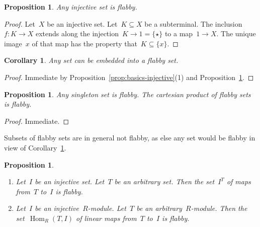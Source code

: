 \documentclass[oneside]{amsart}
\theoremstyle{definition}
\theoremstyle{plain}
\newtheorem{prop}[defn]{Proposition}
\newtheorem{cor}[defn]{Corollary}
\theoremstyle{remark}
\DeclareMathOperator{\Hom}{Hom}
\renewcommand{\_}{\mathpunct{.}\,}
\begin{document}
\begin{prop}\label{prop:injective-flabby}
Any injective set is flabby.\end{prop}

\begin{proof}Let~$X$ be an injective set. Let~$K \subseteq X$ be a subterminal.
The inclusion~$f : K \to X$ extends along the injection~$K \to 1 = \{\star\}$
to a map~$1 \to X$. The unique image~$x$ of that map has the property that~$K
\subseteq \{x\}$.\end{proof}

\begin{cor}\label{cor:enough-flabby-sets}
Any set can be embedded into a flabby set.\end{cor}

\begin{proof}Immediate by Proposition~\ref{prop:basics-injective}(1) and
Proposition~\ref{prop:injective-flabby}.\end{proof}

\begin{prop}Any singleton set is flabby. The cartesian product of flabby sets
is flabby.\end{prop}

\begin{proof}Immediate.\end{proof}

Subsets of flabby sets are in general not flabby, as else any set would be
flabby in view of Corollary~\ref{cor:enough-flabby-sets}.

\begin{prop}\label{prop:hom-flabby}
\begin{enumerate}
\item Let~$I$ be an injective set. Let~$T$ be an arbitrary set. Then the
set~$I^T$ of maps from~$T$ to~$I$ is flabby.
\item Let~$I$ be an injective~$R$-module. Let~$T$ be an arbitrary~$R$-module. Then the
set~$\Hom_R(T,I)$ of linear maps from~$T$ to~$I$ is flabby.
\end{enumerate}\end{prop}
\end{document}
